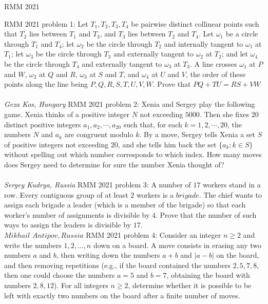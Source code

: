 
RMM 2021 

RMM 2021 problem 1:  Let $T_1, T_2, T_3, T_4$ be pairwise distinct collinear points such that $T_2$ lies between $T_1$ and $T_3$, and $T_3$ lies between $T_2$ and $T_4$. Let $\omega_1$ be a circle through $T_1$ and $T_4$; let $\omega_2$ be the circle through $T_2$ and internally tangent to $\omega_1$ at $T_1$; let $\omega_3$ be the circle through $T_3$ and externally tangent to $\omega_2$ at $T_2$; and let $\omega_4$ be the circle through $T_4$ and externally tangent to $\omega_3$ at $T_3$. A line crosses $\omega_1$ at $P$ and $W$, $\omega_2$ at $Q$ and $R$, $\omega_3$ at $S$ and $T$, and $\omega_4$ at $U$ and $V$, the order of these points along the line being $P,Q,R,S,T,U,V,W$. Prove that $PQ + TU = RS + VW$ \\\\
\textit{Geza Kos, Hungary} 
RMM 2021 problem 2:  Xenia and Sergey play the following game. Xenia thinks of a positive integer $N$ not exceeding $5000$. Then she fixes $20$ distinct positive integers $a_1, a_2, \cdots, a_{20}$ such that, for each $k = 1,2,\cdots,20$, the numbers $N$ and $a_k$ are congruent modulo $k$. By a move, Sergey tells Xenia a set $S$ of positive integers not exceeding $20$, and she tells him back the set $\{a_k : k \in S\}$ without spelling out which number corresponds to which index. How many moves does Sergey need to determine for sure the number Xenia thought of? \\\\
\textit{Sergey Kudrya, Russia} 
RMM 2021 problem 3:  A number of $17$ workers stand in a row. Every contiguous group of at least $2$ workers is a $brigade$. The chief wants to assign each brigade a leader (which is a member of the brigade) so that each worker’s number of assignments is divisible by $4$. Prove that the number of such ways to assign the leaders is divisible by $17$. \\
$Mikhail$ $Antipov, Russia$ 
RMM 2021 problem 4:  Consider an integer \(n \ge 2\) and write the numbers \(1, 2,  \ldots, n\) down on a board. A move consists in erasing any two numbers \(a\) and \(b\), then writing down the numbers \(a+b\) and \(\vert a-b \vert\) on the board, and then removing repetitions (e.g., if the board contained the numbers \(2, 5, 7, 8\), then one could choose the numbers \(a = 5\) and \(b = 7\), obtaining the board with numbers \(2, 8, 12\)). For all integers \(n \ge 2\), determine whether it is possible to be left with exactly two numbers on the board after a finite number of moves. \\\\
